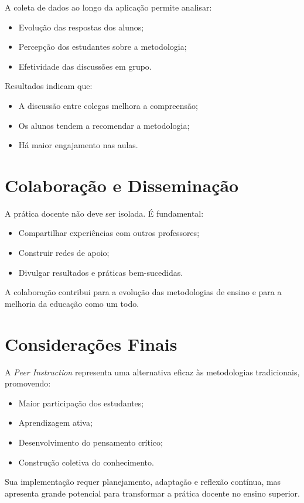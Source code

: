 A coleta de dados ao longo da aplicação permite analisar:

\begin{itemize}
    \item Evolução das respostas dos alunos;
    \item Percepção dos estudantes sobre a metodologia;
    \item Efetividade das discussões em grupo.
\end{itemize}

Resultados indicam que:

\begin{itemize}
    \item A discussão entre colegas melhora a compreensão;
    \item Os alunos tendem a recomendar a metodologia;
    \item Há maior engajamento nas aulas.
\end{itemize}

\section{Colaboração e Disseminação}

A prática docente não deve ser isolada. É fundamental:

\begin{itemize}
    \item Compartilhar experiências com outros professores;
    \item Construir redes de apoio;
    \item Divulgar resultados e práticas bem-sucedidas.
\end{itemize}

A colaboração contribui para a evolução das metodologias de ensino e para a melhoria da educação como um todo.

\section{Considerações Finais}

A {\it Peer Instruction} representa uma alternativa eficaz às metodologias tradicionais, promovendo:

\begin{itemize}
    \item Maior participação dos estudantes;
    \item Aprendizagem ativa;
    \item Desenvolvimento do pensamento crítico;
    \item Construção coletiva do conhecimento.
\end{itemize}

Sua implementação requer planejamento, adaptação e reflexão contínua, mas apresenta grande potencial para transformar a prática docente no ensino superior.